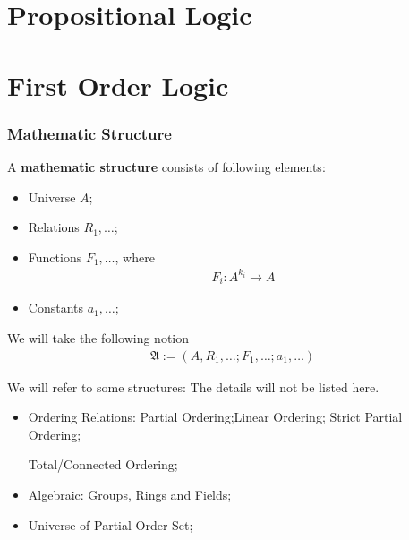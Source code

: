 \documentclass[Total.tex]{subfiles}
\begin{document}
	\chapter{Propositional Logic}
		\section{}
	\chapter{First Order Logic}
			\subsection{Mathematic Structure}
				\begin{Def}
					A \textbf{mathematic structure} consists of following elements:
					\begin{itemize}
						\item Universe $A$;
						\item Relations $R_1,\dots$;
						\item Functions $F_1,\dots$, where
						\begin{gather*}
							F_i:A^{k_i}\rightarrow A
						\end{gather*}
						\item Constants $a_1,\dots$;
					\end{itemize}
					
					We will take the following notion 
					\begin{gather*}
						\mathfrak{A}:=(A,R_1,\dots;F_1,\dots;a_1,\dots)
					\end{gather*}
				\end{Def}
				
				
				We will refer to some structures: The details will not be listed here.
				\begin{itemize}
					\item Ordering Relations: Partial Ordering;Linear Ordering; Strict Partial Ordering;
					
					Total/Connected Ordering;
					\item Algebraic: Groups, Rings and Fields;
					
					\item Universe of Partial Order Set;
				\end{itemize}
				
\end{document}

